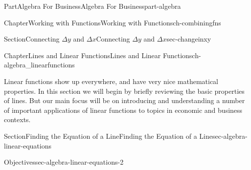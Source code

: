 \documentclass{tufte-book}
\numberwithin{equation}{chapter}
\begin{document}
\begin{partptx}{Part}{Algebra For Business}{}{Algebra For Business}{}{}{part-algebra}
\begin{chapterptx}{Chapter}{Working with Functions}{}{Working with Functions}{}{}{ch-combiningfns}
\begin{sectionptx}{Section}{\textasteriskcentered{}Connecting \(\Delta y\) and \(\Delta x\)}{}{\textasteriskcentered{}Connecting \(\Delta y\) and \(\Delta x\)}{}{}{sec-changeinxy}
\end{sectionptx}
\end{chapterptx}
%
\typeout{************************************************}
\typeout{************************************************}
%
\begin{chapterptx}{Chapter}{Lines and Linear Functions}{}{Lines and Linear Functions}{}{}{ch-algebra_linearfunctions}
\renewcommand*{\chaptername}{Chapter}
\begin{introduction}{}%
Linear functions show up everywhere, and have very nice mathematical properties.  In this section we will begin by briefly reviewing the basic properties of lines. But our main focus will be on introducing and understanding a number of important applications of linear functions to topics in economic and business contexts.%
\begin{image}{0}{1}{0}{}%
%
\end{image}%
\end{introduction}%
%
%
\typeout{************************************************}
\typeout{************************************************}
%
\begin{sectionptx}{Section}{Finding the Equation of a Line}{}{Finding the Equation of a Line}{}{}{sec-algebra-linear-equations}
\begin{objectives}{Objectives}{sec-algebra-linear-equations-2}

\end{objectives}
\end{sectionptx}
\end{chapterptx}
\end{partptx}
\end{document}
